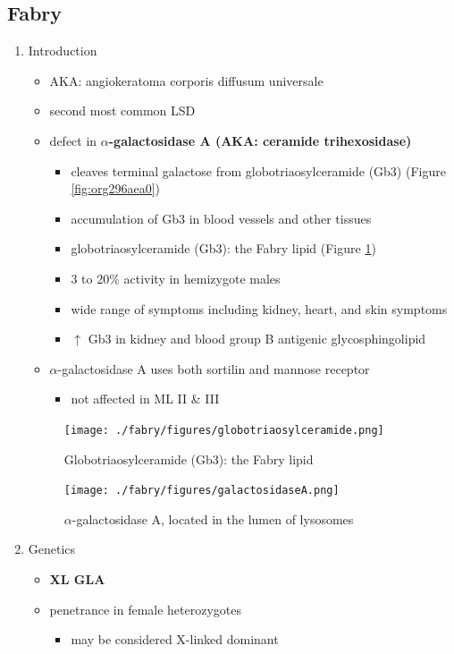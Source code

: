 \documentclass{scrartcl}
\begin{document}
\subsection{Fabry}
\label{sec:org233b3c9}
\begin{enumerate}
\item Introduction
\label{sec:org4b3c41f}
\begin{itemize}
\item AKA: angiokeratoma corporis diffusum universale
\item second most common LSD
\item defect in \textbf{\(\alpha\)-galactosidase A (AKA: ceramide trihexosidase)}
\begin{itemize}
\item cleaves terminal galactose from globotriaosylceramide (Gb3)
(Figure \ref{fig:org296aea0})
\item accumulation of Gb3 in blood vessels and other tissues
\item globotriaosylceramide (Gb3): the Fabry lipid (Figure \ref{fig:org3183f91})
\item 3 to 20\% activity in hemizygote males
\item wide range of symptoms including kidney, heart, and skin symptoms
\item \(\uparrow\) Gb3 in kidney and blood group B antigenic glycosphingolipid
\end{itemize}
\item \(\alpha\)-galactosidase A uses both sortilin and mannose receptor
\begin{itemize}
\item not affected in ML II \& III
\end{itemize}
\end{itemize}

\begin{figure}[htbp]
\centering
\texttt{[image: ./fabry/figures/globotriaosylceramide.png]}
\caption[Globotriaosylceramide]{\label{fig:org3183f91}
Globotriaosylceramide (Gb3): the Fabry lipid}
\end{figure}

\begin{figure}[htbp]
\centering
\texttt{[image: ./fabry/figures/galactosidaseA.png]}
\caption[\(\alpha\)-galactosidase A]{\label{fig:org9ec2bec}
\(\alpha\)-galactosidase A, located in the lumen of lysosomes}
\end{figure}

\item Genetics
\label{sec:orgfea271f}
\begin{itemize}
\item \textbf{XL GLA}
\item penetrance in female heterozygotes
\begin{itemize}
\item may be considered X-linked dominant
\end{itemize}
\end{itemize}


\end{enumerate}
\end{document}
